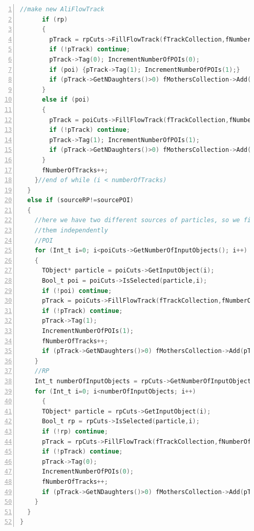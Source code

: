\documentclass[a4paper]{book}
\numberwithin{equation}{subsection}
\begin{document}
\begin{lstlisting}[language=C, numbers=left]
      //make new AliFlowTrack
      if (rp)
      {
        pTrack = rpCuts->FillFlowTrack(fTrackCollection,fNumberOfTracks);
        if (!pTrack) continue;
        pTrack->Tag(0); IncrementNumberOfPOIs(0);
        if (poi) {pTrack->Tag(1); IncrementNumberOfPOIs(1);}
        if (pTrack->GetNDaughters()>0) fMothersCollection->Add(pTrack);
      }
      else if (poi)
      {
        pTrack = poiCuts->FillFlowTrack(fTrackCollection,fNumberOfTracks);
        if (!pTrack) continue;
        pTrack->Tag(1); IncrementNumberOfPOIs(1);
        if (pTrack->GetNDaughters()>0) fMothersCollection->Add(pTrack);
      }
      fNumberOfTracks++;
    }//end of while (i < numberOfTracks)
  }
  else if (sourceRP!=sourcePOI)
  {
    //here we have two different sources of particles, so we fill
    //them independently
    //POI
    for (Int_t i=0; i<poiCuts->GetNumberOfInputObjects(); i++)
    {
      TObject* particle = poiCuts->GetInputObject(i);
      Bool_t poi = poiCuts->IsSelected(particle,i);
      if (!poi) continue;
      pTrack = poiCuts->FillFlowTrack(fTrackCollection,fNumberOfTracks);
      if (!pTrack) continue;
      pTrack->Tag(1);
      IncrementNumberOfPOIs(1);
      fNumberOfTracks++;
      if (pTrack->GetNDaughters()>0) fMothersCollection->Add(pTrack);
    }
    //RP
    Int_t numberOfInputObjects = rpCuts->GetNumberOfInputObjects();
    for (Int_t i=0; i<numberOfInputObjects; i++)
      {
      TObject* particle = rpCuts->GetInputObject(i);
      Bool_t rp = rpCuts->IsSelected(particle,i);
      if (!rp) continue;
      pTrack = rpCuts->FillFlowTrack(fTrackCollection,fNumberOfTracks);
      if (!pTrack) continue;
      pTrack->Tag(0);
      IncrementNumberOfPOIs(0);
      fNumberOfTracks++;
      if (pTrack->GetNDaughters()>0) fMothersCollection->Add(pTrack);
    }
  }
}\end{lstlisting}
\end{document}
